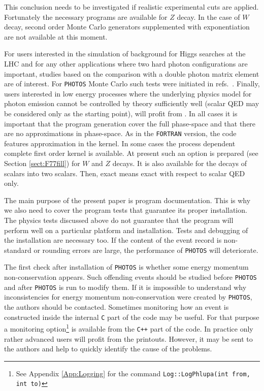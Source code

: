 \documentclass[]{Photos_interface_design}
\begin{document}
This conclusion needs to be investigated if   
realistic experimental 
cuts are applied. Fortunately the necessary programs are available for $Z$ decay.
In the case of $W$ decay, second order Monte Carlo generators supplemented with 
exponentiation are not available at this moment.
 
For users interested in the simulation of
background for Higgs searches at the LHC and for any other applications where 
two hard photon configurations are important, studies based on the comparison with 
a double photon matrix element are of 
interest. For {\tt PHOTOS} Monte Carlo such tests were initiated 
in refs.~\cite{Barberio:1993qi,RichterWas:1994ep,RichterWas:1993ta}.
Finally, users interested in low energy processes where the underlying physics model 
for photon emission cannot be controlled by theory sufficiently well
(scalar QED may 
be considered only as the starting point), will profit 
from \cite{Nanava:2006vv,Nanava:2009vg}. In all cases it is important that
the  program generation cover the full phase-space and that there are no 
approximations in phase-space. As in the {\tt FORTRAN} version, the code 
features approximation in the kernel. In some cases the process dependent 
complete first order 
kernel is available. At present such an option is prepared 
(see Section \ref{sect:F77fill}) for $W$ and $Z$ decays. It is also available for the  decays of scalars 
into two scalars. Then, exact means exact with respect to scalar QED only. 

The main purpose of the present paper is program documentation. This is why
we also need to cover the program tests that guarantee its proper installation.
The physics tests discussed above 
do not guarantee that the program will perform well on a particular platform and installation. Tests and debugging of the installation
are necessary too.  If the content of the event record is non-standard or rounding errors are large, the performance of {\tt PHOTOS} will deteriorate.


The first check after installation of {\tt PHOTOS} is whether some energy momentum 
non-conservation appears. Such offending events should be studied
before {\tt PHOTOS}  and after {\tt PHOTOS} is run to modify them.
If it is impossible to understand why inconsistencies for energy momentum 
non-conservation were created by {\tt PHOTOS}, the authors should be contacted. Sometimes
monitoring how an event is constructed inside the internal {\tt C} part of the code
may be useful. For that purpose a monitoring option\footnote{See Appendix \ref{App:Logging}
for the command {\tt Log::LogPhlupa(int from, int to)}}
 is
available from the {\tt C++} part of the code. In practice only rather
 advanced users will profit from the printouts. However, it may be sent to
the authors and help to quickly identify the cause of the problems.
\end{document}
